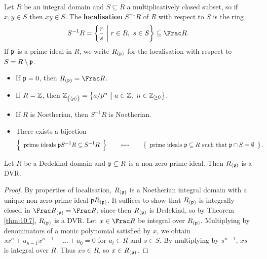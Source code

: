 
Let $ R $ be an integral domain and $ S \subseteq R $ a multiplicatively closed subset, so if $ x, y \in S $ then $ xy \in S $. The \textbf{localisation} $ S^{-1}R $ of $ R $ with respect to $ S $ is the ring
$$ S^{-1}R = \cbr{\dfrac{r}{s} \st r \in R, \ s \in S} \subseteq \Frac R. $$
If $ \mathfrak{p} $ is a prime ideal in $ R $, we write $ R_{\br{\ppp}} $ for the localisation with respect to $ S = R \setminus \mathfrak{p} $.

\pagebreak

\begin{example*}
\hfill
\begin{itemize}
\item If $ \mathfrak{p} = 0 $, then $ R_{\br{\ppp}} = \Frac R $.
\item If $ R = \mathbb{Z} $, then $ \ZZ_{\br{\abr{p}}} = \cbr{a / p^n \st a \in \ZZ, \ n \in \ZZ_{\ge 0}} $.
\end{itemize}
\end{example*}

\begin{fact*}
\hfill
\begin{itemize}
\item If $ R $ is Noetherian, then $ S^{-1}R $ is Noetherian.
\item There exists a bijection
$$ \correspondence{\text{prime ideals} \ \ppp S^{-1}R \subseteq S^{-1}R}{\text{prime ideals} \ \ppp \subseteq R \ \text{such that} \ \ppp \cap S = \emptyset}. $$
\end{itemize}
\end{fact*}

\begin{corollary}
\label{cor:11.1}
Let $ R $ be a Dedekind domain and $ \mathfrak{p} \subseteq R $ is a non-zero prime ideal. Then $ R_{\br{\ppp}} $ is a DVR.
\end{corollary}

\begin{proof}
By properties of localisation, $ R_{\br{\ppp}} $ is a Noetherian integral domain with a unique non-zero prime ideal $ \ppp R_{\br{\ppp}} $. It suffices to show that $ R_{\br{\ppp}} $ is integrally closed in $ \Frac R_{\br{\ppp}} = \Frac R $, since then $ R_{\br{\ppp}} $ is Dedekind, so by Theorem \ref{thm:10.7}, $ R_{\br{\ppp}} $ is a DVR. Let $ x \in \Frac R $ be integral over $ R_{\br{\ppp}} $. Multiplying by denominators of a monic polynomial satisfied by $ x $, we obtain $ sx^n + a_{n - 1}x^{n - 1} + \dots + a_0 = 0 $ for $ a_i \in R $ and $ s \in S $. By multiplying by $ s^{n - 1} $, $ xs $ is integral over $ R $. Thus $ xs \in R $, so $ x \in R_{\br{\ppp}} $.
\end{proof}

